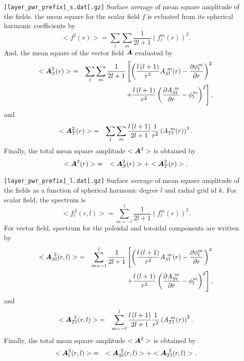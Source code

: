 %
\begin{description}
\item{\tt [layer\_pwr\_prefix]\_s.dat[.gz]} Surface average of mean square amplitude of the fields. the mean square for the scalar field $f$ is evluated from its spherical harmonic coefficients by
%
\begin{equation}
<f^{2}(r)> = \sum_{l}\sum_{m}  \frac{1}{2l + 1} \left(f_{l}^{m}(r) \right)^2.
\end{equation}
%
And, the mean square of the vector field $\mbox{\boldmath$A$}$ evaluated by
%
\begin{eqnarray}
<\mbox{\boldmath$A$}_{S}^{2}(r)> &=& \sum_{l}\sum_{m} \frac{1}{2l + 1}
\left[  \left(\frac{l\left(l+1 \right) }{r^{2}} A_{Sl}^{\ m}(r) - \frac{\partial \phi_{l}^{m}}{\partial r} \right)^{2} 
\right. \nonumber \\
& & \left. +  \frac{l \left( l+1 \right)}{r^{2}} \left( \frac{\partial A_{Sl}^{\ m}}{\partial r} - \phi_{l}^{m} \right)^{2} \right],
\end{eqnarray}
%
and
%
\begin{eqnarray}
<\mbox{\boldmath$A$}_{T}^{2}(r)> &=& \sum_{l}\sum_{m} \frac{l \left( l+1 \right)}{2l + 1} \frac{1}{r^{2}} \left( A_{Tl}^{\ m}(r) \right)^{2}.
\end{eqnarray}
Finally, the total mean square amplitude $<\mbox{\boldmath$A$}^{2}> $ is obtained by
\begin{eqnarray}
<\mbox{\boldmath$A$}^{2}(r)> &=& <\mbox{\boldmath$A$}_{S}^{2}(r)>  + <\mbox{\boldmath$A$}_{T}^{2}(r)> .
\end{eqnarray}
%
%
\item{\tt [layer\_pwr\_prefix]\_l.dat[.gz]} Surface average of mean square amplitude of the fields as a function of spherical harmonic degree $l$ and radial grid id $k$. For scalar field, the spectrum is
%
\begin{equation}
< f_{l}^{\ 2}(r,l)>  = \sum_{m=-l}^{l}  \frac{1}{2l + 1} \left(f_{l}^{m}(r) \right)^2.
\end{equation}
%
For vector field, spectrum for the poloidal and toroidal components are written by 
%
\begin{eqnarray}
<\mbox{\boldmath$A$}_{Sl}^{\ 2}(r,l)> &=&  \sum_{m=-l}^{l}  \frac{1}{2l + 1}
\left[  \left(\frac{l\left(l+1 \right) }{r^{2}} A_{Sl}^{\ m}(r) - \frac{\partial \phi_{l}^{m}}{\partial r} \right)^{2} 
\right. \nonumber \\
& & \left. +  \frac{l \left( l+1 \right)}{r^{2}} \left( \frac{\partial A_{Sl}^{\ m}}{\partial r} - \phi_{l}^{m} \right)^{2} \right],
\end{eqnarray}
%
and
\begin{eqnarray}
<\mbox{\boldmath$A$}_{Tl}^{\ 2}(r,l)>  &=& \sum_{m=-l}^{l} \frac{l \left( l+1 \right)}{2l + 1} \frac{1}{r^{2}} \left( A_{Tl}^{\ m}(r) \right)^{2}.
\end{eqnarray}
Finally, the total mean square amplitude $<\mbox{\boldmath$A$}^{2}> $ is obtained by
\begin{eqnarray}
<\bvec{A}_{l}^{2}(r,l)> &=& <\bvec{A}_{Sl}^{\ 2}(r,l)>  + <\bvec{A}_{Tl}^{\ 2}(r,l)> .
\end{eqnarray}


\end{description}
